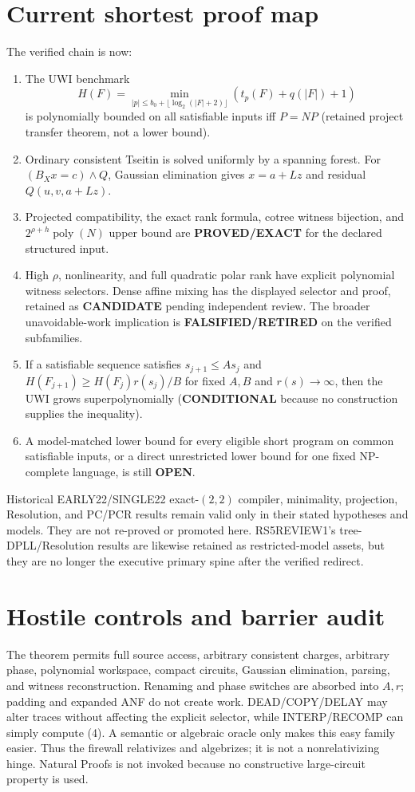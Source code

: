\documentclass[11pt]{article}
\newcommand{\EXACT}{\textbf{PROVED/EXACT}}
\newcommand{\COND}{\textbf{CONDITIONAL}}
\newcommand{\CAND}{\textbf{CANDIDATE}}
\newcommand{\OPEN}{\textbf{OPEN}}
\newcommand{\RET}{\textbf{FALSIFIED/RETIRED}}
\begin{document}
\section{Current shortest proof map}
The verified chain is now:
\begin{enumerate}
\item The UWI benchmark
\[
H(F)=\min_{|p|\le b_0+\lfloor\log_2(|F|+2)\rfloor}
       (t_p(F)+q(|F|)+1)
\]
is polynomially bounded on all satisfiable inputs iff $P=NP$ (retained project
transfer theorem, not a lower bound).
\item Ordinary consistent Tseitin is solved uniformly by a spanning forest.
For $(B_Xx=c)\land Q$, Gaussian elimination gives $x=a+Lz$ and residual
$Q(u,v,a+Lz)$.
\item Projected compatibility, the exact rank formula, cotree witness
bijection, and $2^{\rho+h}\operatorname{poly}(N)$ upper bound are \EXACT{} for
the declared structured input.
\item High $\rho$, nonlinearity, and full quadratic polar rank have explicit
polynomial witness selectors.  Dense affine mixing has the displayed selector
and proof, retained as \CAND{} pending independent review.  The broader
unavoidable-work implication is \RET{} on the verified subfamilies.
\item If a satisfiable sequence satisfies $s_{j+1}\le As_j$ and
$H(F_{j+1})\ge H(F_j)r(s_j)/B$ for fixed $A,B$ and $r(s)\to\infty$, then the
UWI grows superpolynomially (\COND{} because no construction supplies the
inequality).
\item A model-matched lower bound for every eligible short program on common
satisfiable inputs, or a direct unrestricted lower bound for one fixed
NP-complete language, is still \OPEN{}.
\end{enumerate}

Historical EARLY22/SINGLE22 exact-$(2,2)$ compiler, minimality, projection,
Resolution, and PC/PCR results remain valid only in their stated hypotheses and
models.  They are not re-proved or promoted here.  RS5REVIEW1's
tree-DPLL/Resolution results are likewise retained as restricted-model assets,
but they are no longer the executive primary spine after the verified redirect.

\section{Hostile controls and barrier audit}
The theorem permits full source access, arbitrary consistent charges, arbitrary
phase, polynomial workspace, compact circuits, Gaussian elimination, parsing,
and witness reconstruction.  Renaming and phase switches are absorbed into
$A,r$; padding and expanded ANF do not create work.  DEAD/COPY/DELAY may alter
traces without affecting the explicit selector, while INTERP/RECOMP can simply
compute (4).  A semantic or algebraic oracle only makes this easy family easier.
Thus the firewall relativizes and algebrizes; it is not a nonrelativizing hinge.
Natural Proofs is not invoked because no constructive large-circuit property is
used.
\end{document}
